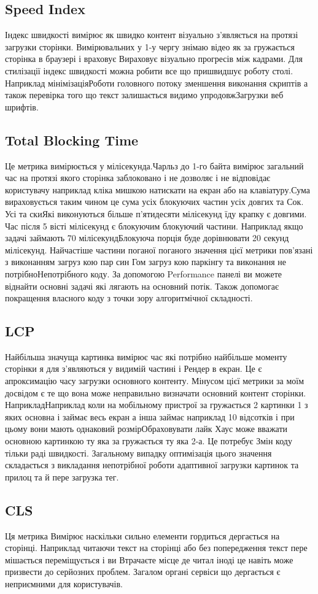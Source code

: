 \subsection{Speed Index}
Індекс швидкості вимірює як швидко контент візуально з'являється на протязі загрузки сторінки. Вимірювальних у 1-у чергу знімаю відео як за гружається сторінка в браузері і враховує Вираховує візуально прогресів між кадрами.
Для стилізації індекс швидкості можна робити все що пришвидшує роботу столі. Наприклад мінімізаціяРоботи головного потоку зменшення виконання скриптів а також перевірка того що текст залишається видимо упродовжЗагрузки веб шрифтів.

\subsection{Total Blocking Time}
Це метрика вимірюється у мілісекунда.Чарльз до 1-го байта вимірює загальний час на протязі якого сторінка заблоковано і не дозволяє і не відповідає користувачу наприклад кліка мишкою натискати на екран або на клавіатуру.Сума вираховується таким чином це сума усіх блокуючих частин усіх довгих та Сок. Усі та скиЯкі виконуються більше п'ятидесяти мілісекунд їду крапку є довгими. Час після 5 вісті мілісекунд є блокуючим блокуючий частини. Наприклад якщо задачі займають 70 мілісекундБлокуюча порція буде дорівнювати 20 секунд мілісекунд.
Найчастіше частини поганої поганого значення цієї метрики пов'язані з виконанням загруз кою пар син Гом загруз кою паркінгу та виконання не потрібноНепотрібного коду. За допомогою Performance панелі ви можете віднайти основні задачі які лягають на основний потік.
Також допомогає покращення власного коду з точки зору алгоритмічної складності.

\subsection{LCP}
Найбільша значуща картинка вимірює час які потрібно найбільше моменту сторінки я для з'являються у видимій частині і Рендер в екран.
Це є апроксимацію часу загрузки основного контенту. Мінусом цієї метрики за моїм досвідом є те що вона може неправильно визначати основний контент сторінки. НаприкладНаприклад коли на мобільному пристрої за гружається 2 картинки 1 з яких основна і займає весь екран а інша займає наприклад 10 відсотків і при цьому вони мають однаковий розмірОбраховувати лайк Хаус може вважати основною картинкою ту яка за гружається ту яка 2-а. Це потребує Змін коду тільки раді швидкості.
Загальному випадку оптимізація цього значення складається з викладання непотрібної роботи адаптивної загрузки картинок та прилоц та й пере загрузка тег.

\subsection{CLS}
Ця метрика Вимірює наскільки сильно елементи гордиться дергається на сторінці.
Наприклад читаючи текст на сторінці або без попередження текст пере мішається переміщується і ви Втрачаєте місце де читал іноді це навіть може призвести до серйозних проблем. Загалом органі сервіси що дергається є неприємними для користувачів.


